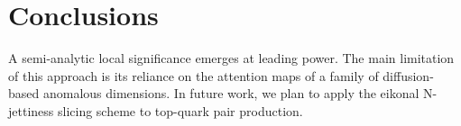 \section{Conclusions}\label{sec:conclusions}

A semi-analytic local significance emerges at leading power. The main
limitation of this approach is its reliance on the attention maps of a
family of diffusion-based anomalous dimensions. In future work, we plan
to apply the eikonal N-jettiness slicing scheme to top-quark pair
production.

